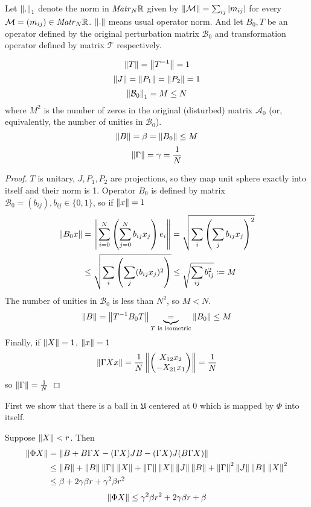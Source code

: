 \documentclass{article}
\begin{document}
\begin{lemma}
    Let ${\left\|{.}\right\|}_{1}$ denote the norm in $\mathit{Matr}_{N} {\mathbb{R}}$ given by
    $\left\|{\mathcal M}\right\| = \sum_{ij} \left|m_{ij}\right|$ for every $\mathcal M=(m_{ij})\in\mathit{Matr}_{N} {\mathbb{R}}$.
    $\left\|{.}\right\|$ means usual operator norm.
    And let $B_0, T$ be an operator defined by the original perturbation matrix $\mathcal B_0$
    and transformation operator defined by matrix $\mathcal T$ respectively.

    $$\left\|{T}\right\| = \left\|{T^{-1}}\right\| = 1$$
    $$\left\|{J}\right\| = \left\|{P_1}\right\| = \left\|{P_2}\right\| = 1$$
    $$\left\|{\mathcal B_0}\right\|_1 = M \leq N$$
    where $M^2$ is the number of zeros in the original (disturbed) matrix $\mathcal A_0$
    (or, equivalently, the number of unities in $\mathcal B_0$).
    $$\left\|{B}\right\| = \beta = \left\|{B_0}\right\| \leq M$$
    $$\left\|{\Gamma}\right\| = \gamma = \frac{1}{N}$$
\end{lemma}
\begin{proof}
    $T$ is unitary, $J, P_1, P_2$ are projections, so they map unit sphere exactly into itself and their norm is 1.
    Operator $B_0$ is defined by matrix $\mathcal B_0 = \left(b_{ij}\right), b_{ij}\in\{0,1\}$,
    so if $\left\|{x}\right\| = 1$
    \[
        \begin{split}
            \left\|{B_0 x}\right\| &= \left\|{\sum_{i=0}^N \left(\sum_{j=0}^N b_{ij} x_j\right) e_i}\right\|
            = \sqrt{\sum_i \left(\sum_j b_{ij} x_j\right)^2} \\
            &\leq \sqrt{\sum_i \left(\sum_j (b_{ij} x_j)^2\right)}
            \leq \sqrt{\sum_{ij} b_{ij}^2} \coloneqq M
        \end{split}
    \]
The number of unities in $\mathcal B_0$ is less than $N^2$, so $M<N$.
$$\left\|{B}\right\| = \left\|{T^{-1} B_0 T}\right\| \underbrace{=}_{T \text{ is isometric}} \left\|{B_0}\right\| \leq M$$
    Finally, if $\left\|{X}\right\| = 1$, $\left\|{x}\right\| = 1$
    $$\left\|{\Gamma X x}\right\| = \frac1N \left\|{\begin{pmatrix}X_{12}x_2 \\ -X_{21}x_1\end{pmatrix}}\right\| = \frac1N$$
    so $\left\|{\Gamma}\right\| = \frac1N$
\end{proof}

First we show that there is a ball in $\mathfrak U$ centered at $0$
which is mapped by $\Phi$ into itself.

Suppose $\left\|{X}\right\| < r$.
Then
    \begin{align*}
        \left\|{\Phi X}\right\| &=    \left\|{B + B\Gamma X - (\Gamma X) JB - (\Gamma X)J(B\Gamma X)}\right\| \\
                     &\leq \left\|{B}\right\| + \left\|{B}\right\|\left\|{\Gamma}\right\| \left\|{X}\right\| + \left\|{\Gamma}\right\|\left\|{X}\right\|\left\|{J}\right\|\left\|{B}\right\| + \left\|{\Gamma}\right\|^2\left\|{J}\right\|\left\|{B}\right\|\left\|{X}\right\|^2 \\
                     &\leq \beta + 2\gamma\beta r + \gamma^2\beta r^2
    \end{align*}
    \begin{equation}
        \label{eq:phi_norm_b1}
        \left\|{\Phi X}\right\| \leq \gamma^2\beta r^2 + 2\gamma\beta r + \beta
    \end{equation}
\end{document}
